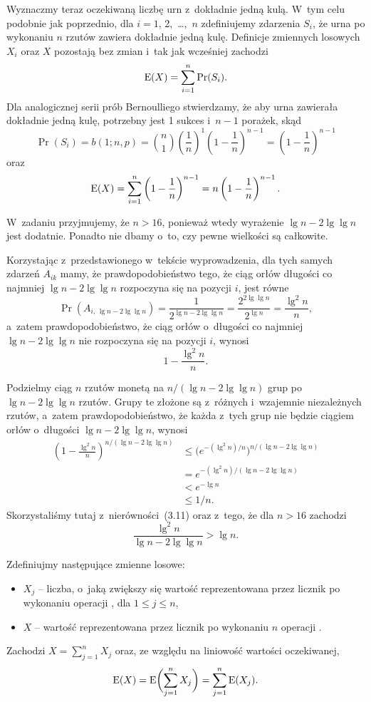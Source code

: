 Wyznaczmy teraz oczekiwaną liczbę urn z~dokładnie jedną kulą. W~tym celu podobnie jak poprzednio, dla $i=1$, 2,~\dots,~$n$ zdefiniujemy zdarzenia $S_i$, że  urna po wykonaniu $n$ rzutów zawiera dokładnie jedną kulę. Definicje zmiennych losowych $X_i$ oraz $X$ pozostają bez zmian i~tak jak wcześniej zachodzi
\[
	\operatorname{E}(X) = \sum_{i=1}^n\Pr(S_i).
\]
Dla analogicznej serii prób Bernoulliego stwierdzamy, że aby  urna zawierała dokładnie jedną kulę, potrzebny jest 1 sukces i~$n-1$ porażek, skąd
\[
	\Pr(S_i) = b(1;n,p) = \binom{n}{1}\left(\frac{1}{n}\right)^1\left(1-\frac{1}{n}\right)^{n-1} = \left(1-\frac{1}{n}\right)^{n-1}
\]
oraz
\[
	\operatorname{E}(X) = \sum_{i=1}^n\left(1-\frac{1}{n}\right)^{n-1} = n\left(1-\frac{1}{n}\right)^{n-1}.
\]

\exercise %
W~zadaniu przyjmujemy, że $n>16$, ponieważ wtedy wyrażenie $\lg n-2\lg\lg n$ jest dodatnie. Ponadto nie dbamy o~to, czy pewne wielkości są całkowite.

Korzystając z~przedstawionego w~tekście wyprowadzenia, dla tych samych zdarzeń $A_{ik}$ mamy, że prawdopodobieństwo tego, że ciąg orłów długości co najmniej $\lg n-2\lg\lg n$ rozpoczyna się na pozycji $i$, jest równe
\[
	\Pr(A_{i,\,\lg n-2\lg\lg n}) = \frac{1}{2^{\lg n-2\lg\lg n}} = \frac{2^{2\lg\lg n}}{2^{\lg n}} = \frac{\lg^2n}{n},
\]
a~zatem prawdopodobieństwo, że ciąg orłów o~długości co najmniej $\lg n-2\lg\lg n$ nie rozpoczyna się na pozycji $i$, wynosi
\[
	1-\frac{\lg^2n}{n}.
\]

Podzielmy ciąg $n$ rzutów monetą na $n/(\lg n-2\lg\lg n)$ grup po $\lg n-2\lg\lg n$ rzutów. Grupy te złożone są z~różnych i~wzajemnie niezależnych rzutów, a~zatem prawdopodobieństwo, że każda z~tych grup nie będzie ciągiem orłów o~długości $\lg n-2\lg\lg n$, wynosi
\begin{align*}
	\left(1-\frac{\lg^2n}{n}\right)^{n/(\lg n-2\lg\lg n)} &\le \bigl(e^{-(\lg^2n)/n}\bigr)^{n/(\lg n-2\lg\lg n)} \\
	&= e^{-(\lg^2n)/(\lg n-2\lg\lg n)} \\
	&< e^{-\lg n} \\
	&\le 1/n.
\end{align*}
Skorzystaliśmy tutaj z~nierówności~(3.11) oraz z~tego, że dla $n>16$ zachodzi
\[
	\frac{\lg^2n}{\lg n-2\lg\lg n} > \lg n.
\]

\problems


\subproblem %
Zdefiniujmy następujące zmienne losowe:
\begin{itemize}
	\item $X_j$ -- liczba, o~jaką zwiększy się wartość reprezentowana przez licznik po  wykonaniu operacji , dla $1\le j\le n$,
	\item $X$ -- wartość reprezentowana przez licznik po wykonaniu $n$ operacji .
\end{itemize}
Zachodzi $X=\sum_{j=1}^nX_j$ oraz, ze względu na liniowość wartości oczekiwanej,
\[
	\operatorname{E}(X) = \operatorname{E}\biggl(\sum_{j=1}^nX_j\biggr) = \sum_{j=1}^n\operatorname{E}(X_j).
\]


